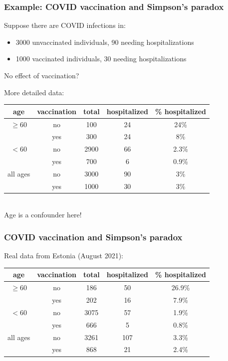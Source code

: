 \documentclass[10pt,dvipsnames,t,handout%
,aspectratio=169%
]{beamer}%
\begin{document}
\begin{frame}
	\frametitle{Example: COVID vaccination and Simpson's paradox}
\begin{block}{Suppose there are COVID infections in:}
\begin{itemize}
\item 3000 unvaccinated individuals, 90 needing hospitalizations
\item 1000 vaccinated individuals, 30 needing hospitalizations
\end{itemize}
\alert{No effect of vaccination?} 
\end{block} 
\pause 
	More detailed data: \\[0.2cm]
\begin{tabular}{|c|c|c|c|c|}
	\hline 
	age & vaccination & total & hospitalized & \% hospitalized \\
	\hline  
	$\ge 60$  & no & 100 & 24 & 24\% \\
	& yes & 300 & 24 & 8\% \\
	\hline 
	$<60$  & no & 2900 & 66 & 2.3\% \\
	& yes & 700 & 6 & 0.9\% \\
	\hline 
	all ages & no & 3000 & 90 & 3\% \\
	& yes & 1000 & 30 & 3\% \\
	\hline 	
\end{tabular}
\mbox{}\\[0.2cm]

	\alert{Age is a confounder here!}

\end{frame}

\begin{frame}
	\frametitle{COVID vaccination and Simpson's paradox}
	Real data from Estonia (August 2021): \\[0.2cm]
	\begin{tabular}{|c|c|c|c|c|}
		\hline 
		age & vaccination & total & hospitalized & \% hospitalized \\
		\hline  
	$\ge 60$  & no & 186 & 50 & 26.9\% \\
          & yes & 202 & 16 & 7.9\% \\
	\hline 
	$<60$  & no & 3075 & 57 & 1.9\% \\
	       & yes & 666 & 5 & 0.8\% \\
	\hline 
    all ages & no & 3261 & 107 & 3.3\% \\
               & yes & 868 & 21 & 2.4\% \\
\hline 	
\end{tabular}
\mbox{}\\
\end{frame}
\end{document}
